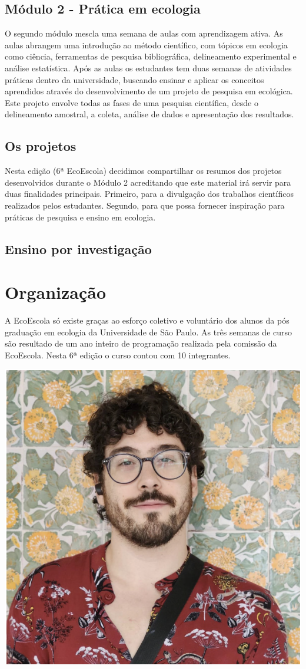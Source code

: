 \documentclass[
]{book}
\begin{document}
\section{Módulo 2 - Prática em ecologia}\label{muxf3dulo-2---pruxe1tica-em-ecologia}

O segundo módulo mescla uma semana de aulas com aprendizagem ativa. As aulas abrangem uma introdução ao método científico, com tópicos em ecologia como ciência, ferramentas de pesquisa bibliográfica, delineamento experimental e análise estatística. Após as aulas os estudantes tem duas semanas de atividades práticas dentro da universidade, buscando ensinar e aplicar os conceitos aprendidos através do desenvolvimento de um projeto de pesquisa em ecológica. Este projeto envolve todas as fases de uma pesquisa científica, desde o delineamento amostral, a coleta, análise de dados e apresentação dos resultados.

\section{Os projetos}\label{os-projetos}

Nesta edição (6ª EcoEscola) decidimos compartilhar os resumos dos projetos desenvolvidos durante o Módulo 2 acreditando que este material irá servir para duas finalidades principais. Primeiro, para a divulgação dos trabalhos científicos realizados pelos estudantes. Segundo, para que possa fornecer inspiração para práticas de pesquisa e ensino em ecologia.

\section{Ensino por investigação}\label{ensino-por-investigauxe7uxe3o}

\chapter{Organização}\label{organizauxe7uxe3o}

A EcoEscola só existe graças ao esforço coletivo e voluntário dos alunos da pós graduação em ecologia da Universidade de São Paulo. As três semanas de curso são resultado de um ano inteiro de programação realizada pela comissão da EcoEscola. Nesta 6ª edição o curso contou com 10 integrantes.

\begin{center}\includegraphics[width=0.5\linewidth]{figs/arthur_picture} \end{center}
\end{document}
